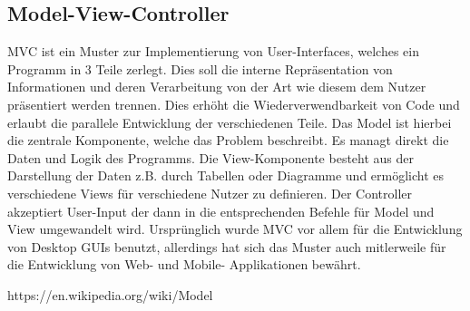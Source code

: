 \subsection{Model-View-Controller}
MVC ist ein Muster zur Implementierung von User-Interfaces, welches ein Programm in 3
Teile zerlegt. Dies soll die interne Repräsentation von Informationen und deren Verarbeitung
von der Art wie diesem dem Nutzer präsentiert werden trennen. Dies erhöht die Wiederverwendbarkeit
von Code und erlaubt die parallele Entwicklung der verschiedenen Teile. Das Model ist hierbei
die zentrale Komponente, welche das Problem beschreibt. Es managt direkt die Daten und Logik
des Programms. Die View-Komponente besteht aus der Darstellung der Daten z.B. durch Tabellen
oder Diagramme und ermöglicht es verschiedene Views für verschiedene Nutzer zu definieren.
Der Controller akzeptiert User-Input der dann in die entsprechenden Befehle für Model und 
View umgewandelt wird. Ursprünglich wurde MVC vor allem für die Entwicklung von Desktop 
GUIs benutzt, allerdings hat sich das Muster auch mitlerweile für die Entwicklung von 
Web- und Mobile- Applikationen bewährt.

https://en.wikipedia.org/wiki/Model%